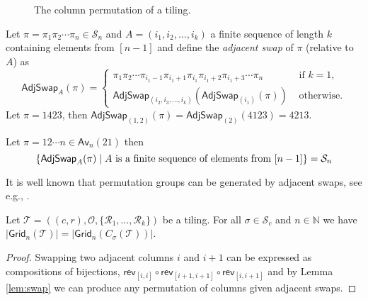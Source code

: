\begin{figure}[ht!]
    \centering
    
    \caption{The column permutation of a tiling.}
    \label{fig:t_col_perm}
\end{figure}

Let $\pi=\pi_1\pi_2 \dotsm \pi_n \in\mathcal{S}_n$ and $A = (i_1, i_2,\dotsc,i_k)$ a finite sequence of length $k$ containing elements from $[n-1]$ and define the \emph{adjacent swap} of $\pi$ (relative to $A$) as
\[
\textsf{AdjSwap}_{A}(\pi) = \begin{cases}
\pi_1\pi_2 \dotsm \pi_{i_1-1}\pi_{i_1+1}\pi_{i_1}\pi_{i_1+2}\pi_{i_1+3} \dotsm \pi_n & \mbox{ if } k = 1,\\
\textsf{AdjSwap}_{(i_2,i_3,\dotsc,i_k)}\left(\textsf{AdjSwap}_{(i_1)}(\pi)\right) & \mbox{ otherwise.}
\end{cases}
\]
Let $\pi = 1423$, then $\textsf{AdjSwap}_{(1,2)}(\pi) = \textsf{AdjSwap}_{(2)}(4123) = 4213$.

\begin{lemma}\label{lem:swap}
Let $\pi = 12\dotsm n \in \textsf{Av}_n(21)$ then
\[
    \left\{\textsf{AdjSwap}_A(\pi) \mid A \text{ is a finite sequence of elements from } [n-1]\right\} = \mathcal{S}_n
\]
\end{lemma}
It is well known that permutation groups can be generated by adjacent swaps, see e.g., \cite{adjacentperm}.

\begin{comment}\begin{proof}
Suppose we can generate $\mathcal{S}_{n-1}$ this way from the permutation in $\textsf{Av}_{n-1}(21)$ and let $\pi = \pi_1 \pi_2 \dotsm \pi_n \in \mathcal{S}_n$ with $\pi_j = n$. Let $A = (i_1,i_2,\dotsc,i_k)$ be the sequence of swaps that turns $12\dotsm (n-1)$ into $\pi_1 \pi_2 \dotsm \pi_{j-1}\pi_{j+1}\dotsm \pi_n \in \mathcal{S}_{n-1}$, then
\begin{align*}
    \textsf{AdjSwap}_{(i_1,i_2,\dotsc,i_k, n-1, n-2,\dotsc,j)}(12\dotsm n) = \pi
\end{align*}
and since this holds for a base case, it holds for all lengths $n\in\N$.
\end{proof}\end{comment}

\begin{proposition}
Let $\mathcal{T} = ((c,r),\mathcal{O},\{\mathcal{R}_1,\dotsc,\mathcal{R}_k\})$ be a tiling. For all $\sigma\in\mathcal{S}_c$ and $n\in\mathbb{N}$ we have $|\textsf{Grid}_n(\mathcal{T})| = |\textsf{Grid}_n\left(C_\sigma(\mathcal{T})\right)|$.
\end{proposition}
\begin{proof}
Swapping two adjacent columns $i$ and $i+1$ can be expressed as compositions of bijections, $\textsf{rev}_{[i,i]} \circ \textsf{rev}_{[i+1,i+1]} \circ \textsf{rev}_{[i,i+1]}$ and by Lemma \ref{lem:swap} we can produce any permutation of columns given adjacent swaps.
\end{proof}